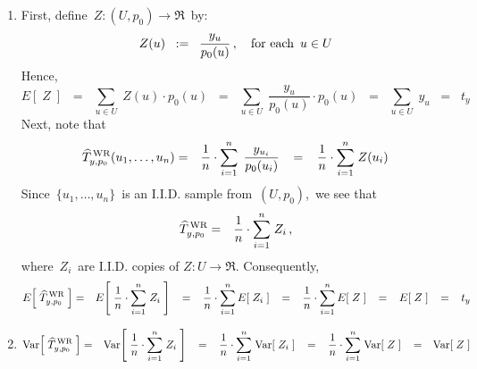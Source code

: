 \proof
\begin{enumerate}
\item
	First, define
	\,$Z : (U,p_{0}) \longrightarrow \Re$\, by:
	\begin{equation*}
	Z(u) \;\; := \;\; \dfrac{y_{u}}{p_{0}(u)}\,,
	\quad
	\textnormal{for each \,$u \in U$}
	\end{equation*}
	Hence,
	\begin{equation*}
	E\!\left[\;Z\;\right]
	\;\; = \;\;
		\underset{u \in U}{\sum}\; Z(u) \cdot p_{0}(u)
	\;\; = \;\;
		\underset{u \in U}{\sum}\; \dfrac{y_{u}}{p_{0}(u)} \cdot p_{0}(u)
	\;\; = \;\;
		\underset{u \in U}{\sum}\; y_{u}
	\;\; = \;\;
		t_{y}
	\end{equation*}
	Next, note that
	\begin{eqnarray*}
	\widehat{T}^{\,\textnormal{WR}}_{y,p_{0}}(u_{1},\ldots,u_{n})
	&=&
		\dfrac{1}{n}\cdot \overset{n}{\underset{i = 1}{\sum}}\;\, \dfrac{y_{u_{i}}}{p_{0}(u_{i})}
	\;\;\; = \;\;\;
		\dfrac{1}{n}\cdot \overset{n}{\underset{i = 1}{\sum}}\; Z(u_{i})
	\end{eqnarray*}
	Since \,$\{u_{1},\ldots,u_{n}\}$\, is an I.I.D. sample from \,$(U,p_{0})$,\,
	we see that
	\begin{eqnarray*}
	\widehat{T}^{\,\textnormal{WR}}_{y,p_{0}}
	&=&
		\dfrac{1}{n}\cdot \overset{n}{\underset{i = 1}{\sum}}\; Z_{i}\,,
	\end{eqnarray*}
	where \,$Z_{i}$\, are I.I.D. copies of $Z : U \longrightarrow \Re$.
	Consequently,
	\begin{eqnarray*}
	E\!\left[\;\widehat{T}^{\,\textnormal{WR}}_{y,p_{0}}\;\right]
	&=&
		E\!\left[\;
			\dfrac{1}{n}\cdot \overset{n}{\underset{i = 1}{\sum}}\; Z_{i}
			\;\right]
	\;\;\; = \;\;\;
		\dfrac{1}{n} \cdot
		\overset{n}{\underset{i = 1}{\sum}}\,
		E\!\left[\; Z_{i} \;\right]
	\;\;\; = \;\;\;
		\dfrac{1}{n} \cdot
		\overset{n}{\underset{i = 1}{\sum}}\,
		E\!\left[\; Z \;\right]
	\;\;\; = \;\;\;
		E\!\left[\; Z \;\right]
	\;\;\; = \;\;\;
		t_{y}
	\end{eqnarray*}
\item
	\begin{eqnarray*}
	\Var\!\left[\;\widehat{T}^{\,\textnormal{WR}}_{y,p_{0}}\;\right]
	& = &
		\Var\!\left[\;
			\dfrac{1}{n}\cdot \overset{n}{\underset{i = 1}{\sum}}\; Z_{i}
			\;\right]
	\;\;\; = \;\;\;
		\dfrac{1}{n}\cdot \overset{n}{\underset{i = 1}{\sum}}\;
		\Var\!\left[\; Z_{i} \;\right]
	\;\;\; = \;\;\;
		\dfrac{1}{n}\cdot \overset{n}{\underset{i = 1}{\sum}}\;
		\Var\!\left[\; Z \;\right]
	\;\;\; = \;\;\,
		\Var\!\left[\; Z \;\right]

\end{eqnarray*}
\end{enumerate}
